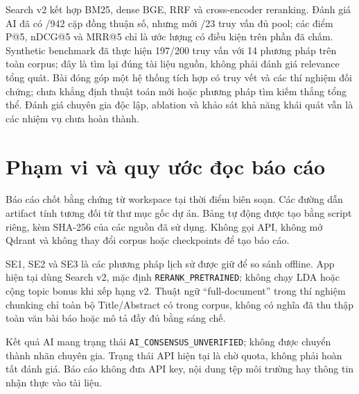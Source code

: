 \documentclass[12pt,a4paper,oneside]{report}
\newcommand{\artifact}[1]{\texttt{\nolinkurl{#1}}}
\begin{document}
Search v2 kết hợp BM25, dense BGE, RRF và cross-encoder reranking. Đánh giá AI đã có \ConsensusPairs/942 cặp đồng thuận số, nhưng mới \CompleteQueries/23 truy vấn đủ pool; các điểm P@5, nDCG@5 và MRR@5 chỉ là ước lượng có điều kiện trên phần đã chấm. Synthetic benchmark đã thực hiện 197/200 truy vấn với 14 phương pháp trên toàn corpus; đây là tìm lại đúng tài liệu nguồn, không phải đánh giá relevance tổng quát. Bài đóng góp một hệ thống tích hợp có truy vết và các thí nghiệm đối chứng; chưa khẳng định thuật toán mới hoặc phương pháp tìm kiếm thắng tổng thể. Đánh giá chuyên gia độc lập, ablation và khảo sát khả năng khái quát vẫn là các nhiệm vụ chưa hoàn thành.
\chapter*{Phạm vi và quy ước đọc báo cáo}
Báo cáo chốt bằng chứng từ workspace tại thời điểm biên soạn. Các đường dẫn artifact tính tương đối từ thư mục gốc dự án. Bảng tự động được tạo bằng script riêng, kèm SHA-256 của các nguồn đã sử dụng. Không gọi API, không mở Qdrant và không thay đổi corpus hoặc checkpoints để tạo báo cáo.

SE1, SE2 và SE3 là các phương pháp lịch sử được giữ để so sánh offline. App hiện tại dùng Search v2, mặc định \artifact{RERANK_PRETRAINED}; không chạy LDA hoặc cộng topic bonus khi xếp hạng v2. Thuật ngữ ``full-document'' trong thí nghiệm chunking chỉ toàn bộ Title/Abstract có trong corpus, không có nghĩa đã thu thập toàn văn bài báo hoặc mô tả đầy đủ bằng sáng chế.

Kết quả AI mang trạng thái \artifact{AI_CONSENSUS_UNVERIFIED}; không được chuyển thành nhãn chuyên gia. Trạng thái API hiện tại là chờ quota, không phải hoàn tất đánh giá. Báo cáo không đưa API key, nội dung tệp môi trường hay thông tin nhận thực vào tài liệu.
\begingroup\small{}\setlength{\parskip}{0pt}\tableofcontents\endgroup
\listoffigures
\listoftables
\end{document}
